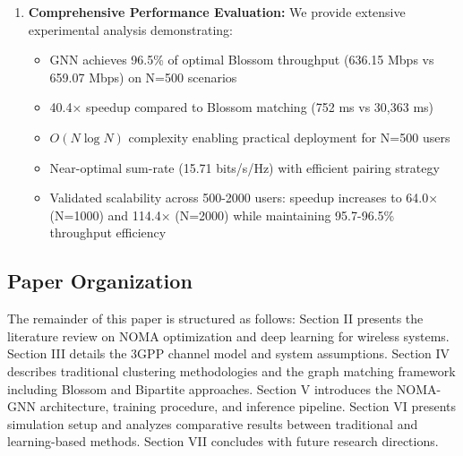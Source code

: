 \begin{enumerate}
    \item \textbf{Comprehensive Performance Evaluation:} We provide extensive experimental analysis demonstrating:
    \begin{itemize}
        \item GNN achieves 96.5\% of optimal Blossom throughput (636.15 Mbps vs 659.07 Mbps) on N=500 scenarios
        \item 40.4× speedup compared to Blossom matching (752 ms vs 30,363 ms)
        \item $O(N \log N)$ complexity enabling practical deployment for N=500 users
        \item Near-optimal sum-rate (15.71 bits/s/Hz) with efficient pairing strategy
        \item Validated scalability across 500-2000 users: speedup increases to 64.0× (N=1000) and 114.4× (N=2000) while maintaining 95.7-96.5\% throughput efficiency
    \end{itemize}
\end{enumerate}

\subsection{Paper Organization}

The remainder of this paper is structured as follows: Section II presents the literature review on NOMA optimization and deep learning for wireless systems. Section III details the 3GPP channel model and system assumptions. Section IV describes traditional clustering methodologies and the graph matching framework including Blossom and Bipartite approaches. Section V introduces the NOMA-GNN architecture, training procedure, and inference pipeline. Section VI presents simulation setup and analyzes comparative results between traditional and learning-based methods. Section VII concludes with future research directions.
